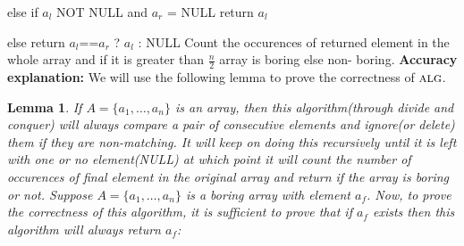 \documentclass[11pt]{article}
\newcommand{\alg}{\textsc{alg}}
\newtheorem{lemma}[theorem]{Lemma}
\begin{document}
else if $a_l$ NOT  NULL and $a_r$ = NULL return $a_l$ 

else return $a_l$==$a_r$ ? $a_l$ : NULL\newline
Count the occurences of returned element in the whole array and if it is greater than $\frac{n}{2}$ array is boring else non-
boring.\newline
{\bf Accuracy explanation:}\newline
We will use the following lemma to prove the correctness of $\alg$.

\begin{lemma}\label{boring-array-lemma}
If $A = \{a_1, \dots, a_n\}$ is an array, then this algorithm(through divide and conquer) will always compare a pair of consecutive elements
and ignore(or delete) them if they are non-matching. It will keep on doing this recursively until it is left with one or no element(NULL) at
which point it will count the number of occurences of final element in the original array and return if the array is boring or not.
Suppose $A = \{a_1, \dots, a_n\}$ is a boring array with element $a_f$. Now, to prove the correctness of this algorithm, it is sufficient to
prove that if $a_f$ exists then this algorithm will always return $a_f$:
\end{lemma}
\end{document}
